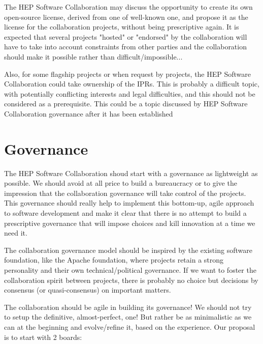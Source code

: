 \documentclass[11pt]{article} %
\begin{document}
The HEP Software Collaboration may discuss the opportunity to create its own open-source license, derived from one of well-known one,
and propose it as the license for the collaboration projects, without being prescriptive again. It is expected that several projects
"hosted" or "endorsed" by the collaboration will have to take into account constraints from other parties and the collaboration should
make it possible rather than difficult/impossible... 

Also, for some flagship projects or when request by projects, the HEP Software Collaboration could take ownership of the IPRs. This
is probably a difficult topic, with potentially conflicting interests and legal difficulties, and this should not be considered as a 
prerequisite. This could be a topic discussed by HEP Software Collaboration governance after it has been established


\section{Governance}

The HEP Software Collaboration shoud start with a governance as lightweight as possible. We should avoid at all price to build
a bureaucracy or to give the impression that the collaboration governance will take control of the projects. This governance should
really help to implement this bottom-up, agile approach to software development and make it clear that there is no attempt to
build a prescriptive governance that will impose choices and kill innovation at a time we need it.

The collaboration governance model should be inspired by the existing software foundation, like the Apache foundation, where projects
retain a strong personality and their own technical/political governance. If we want to foster the collaboration spirit between projects,
there is probably no choice but decisions by consensus (or quasi-consensus) on important matters.

The collaboration should be agile in building its governance! We should not try to setup the definitive, almost-perfect, one! But rather
be as minimalistic as we can at the beginning and evolve/refine it, based on the experience. Our proposal is to start with 2 boards:
\end{document}
